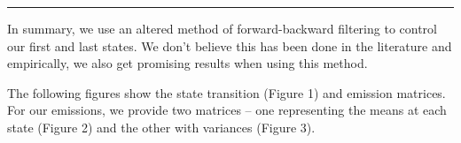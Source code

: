 \documentclass[english]{article}
\numberwithin{equation}{section}
\DeclarePairedDelimiter\paren{(}{)}           %
\DeclarePairedDelimiter\bkt{[}{]}             %
\begin{document}
	
	\par\noindent\rule{\textwidth}{0.4pt}
	
	In summary, we use an altered method of forward-backward filtering to control our first and last states. We don't believe this has been done in the literature and empirically, we also get promising results when using this method. 

	The following figures show the state transition (Figure 1) and emission matrices. For our emissions, we provide two matrices -- one representing the means at each state (Figure 2) and the other with variances (Figure 3).
%	
%	
%	
%	
%	
%	
%	
%	
	
\end{document}
